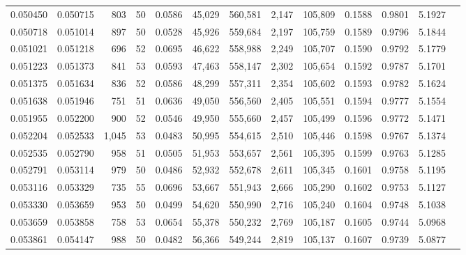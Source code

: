 \begin{tabular}{rrrrrrrrrrrrr}
0.050450 & 0.050715 &   803 &  50 &                                     0.0586 &  45,029 & 560,581 &   2,147 & 105,809 & 0.1588 & 0.9801 & 5.1927 \\
0.050718 & 0.051014 &   897 &  50 &                                     0.0528 &  45,926 & 559,684 &   2,197 & 105,759 & 0.1589 & 0.9796 & 5.1844 \\
0.051021 & 0.051218 &   696 &  52 &                                     0.0695 &  46,622 & 558,988 &   2,249 & 105,707 & 0.1590 & 0.9792 & 5.1779 \\
0.051223 & 0.051373 &   841 &  53 &                                     0.0593 &  47,463 & 558,147 &   2,302 & 105,654 & 0.1592 & 0.9787 & 5.1701 \\
0.051375 & 0.051634 &   836 &  52 &                                     0.0586 &  48,299 & 557,311 &   2,354 & 105,602 & 0.1593 & 0.9782 & 5.1624 \\
0.051638 & 0.051946 &   751 &  51 &                                     0.0636 &  49,050 & 556,560 &   2,405 & 105,551 & 0.1594 & 0.9777 & 5.1554 \\
0.051955 & 0.052200 &   900 &  52 &                                     0.0546 &  49,950 & 555,660 &   2,457 & 105,499 & 0.1596 & 0.9772 & 5.1471 \\
0.052204 & 0.052533 & 1,045 &  53 &                                     0.0483 &  50,995 & 554,615 &   2,510 & 105,446 & 0.1598 & 0.9767 & 5.1374 \\
0.052535 & 0.052790 &   958 &  51 &                                     0.0505 &  51,953 & 553,657 &   2,561 & 105,395 & 0.1599 & 0.9763 & 5.1285 \\
0.052791 & 0.053114 &   979 &  50 &                                     0.0486 &  52,932 & 552,678 &   2,611 & 105,345 & 0.1601 & 0.9758 & 5.1195 \\
0.053116 & 0.053329 &   735 &  55 &                                     0.0696 &  53,667 & 551,943 &   2,666 & 105,290 & 0.1602 & 0.9753 & 5.1127 \\
0.053330 & 0.053659 &   953 &  50 &                                     0.0499 &  54,620 & 550,990 &   2,716 & 105,240 & 0.1604 & 0.9748 & 5.1038 \\
0.053659 & 0.053858 &   758 &  53 &                                     0.0654 &  55,378 & 550,232 &   2,769 & 105,187 & 0.1605 & 0.9744 & 5.0968 \\
0.053861 & 0.054147 &   988 &  50 &                                     0.0482 &  56,366 & 549,244 &   2,819 & 105,137 & 0.1607 & 0.9739 & 5.0877 \\

\end{tabular}
